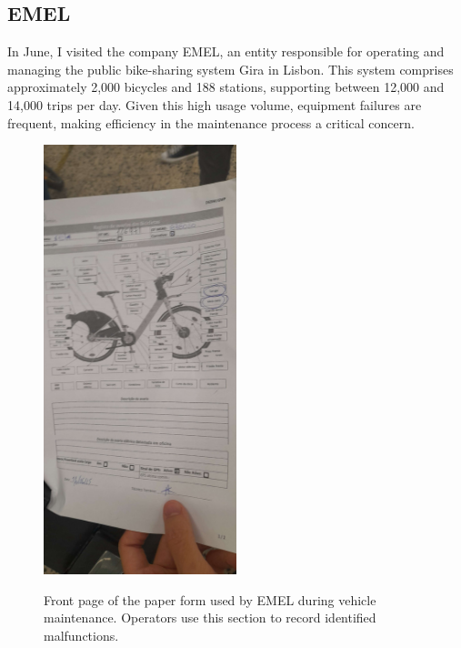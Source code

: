 \subsection{EMEL}


In June, I visited the company \ac{EMEL}, an entity responsible for operating and managing the public bike-sharing system Gira in Lisbon. This system comprises approximately 2,000 bicycles and 188 stations, supporting between 12,000 and 14,000 trips per day. Given this high usage volume, equipment failures are frequent, making efficiency in the maintenance process a critical concern.

\begin{figure}[h]
  \caption{Front page of the paper form used by EMEL during vehicle maintenance. Operators use this section to record identified malfunctions.}
  \centering
  \includegraphics[width=0.50\textwidth]{figs/chapter2/emel_front}
  \label{fig:emel_front}
\end{figure}

